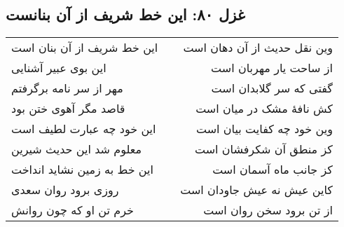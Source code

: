 \begin{center}
\section*{غزل ۸۰: این خط شریف از آن بنانست}
\label{sec:080}
\begin{longtable}{l p{0.5cm} r}
این خط شریف از آن بنان است
&&
وین نقل حدیث از آن دهان است
\\
این بوی عبیر آشنایی
&&
از ساحت یار مهربان است
\\
مهر از سر نامه برگرفتم
&&
گفتی که سر گلابدان است
\\
قاصد مگر آهوی ختن بود
&&
کش نافهٔ مشک در میان است
\\
این خود چه عبارت لطیف است
&&
وین خود چه کفایت بیان است
\\
معلوم شد این حدیث شیرین
&&
کز منطق آن شکرفشان است
\\
این خط به زمین نشاید انداخت
&&
کز جانب ماه آسمان است
\\
روزی برود روان سعدی
&&
کاین عیش نه عیش جاودان است
\\
خرم تن او که چون روانش
&&
از تن برود سخن روان است
\\
\end{longtable}
\end{center}

